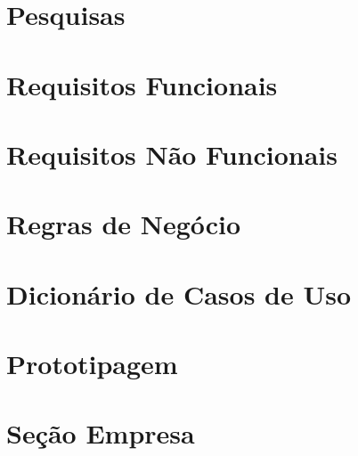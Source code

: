 \documentclass[
	article,			%
	12pt,				%
	oneside,			%
	a4paper,			%
    BIBLATEX,           %
	english,			%
	brazil,				%
	sumario=tradicional
	]{abntex2}
\begin{document}

\newpage
\begin{apendicesenv}

\chapter{Pesquisas\label{pesquisas}}



\newpage

\chapter{Requisitos Funcionais\label{requisitos_f}}



\newpage

\chapter{Requisitos Não Funcionais\label{requisitos_nf}}



\newpage

\chapter{Regras de Negócio\label{regras_negocio}}



\newpage

\chapter{Dicionário de Casos de Uso\label{dicionario_casos_uso}}



\newpage

\chapter{Prototipagem\label{prototipagem}}


\newpage

\chapter{Seção Empresa \label{secao_empresa}}


\end{apendicesenv}
\end{document}
